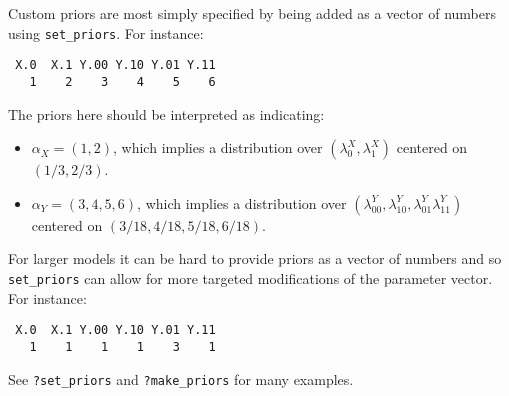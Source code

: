 \documentclass[
  12pt,
]{book}
\newenvironment{Shaded}{\begin{snugshade}}{\end{snugshade}}
\newcommand{\DataTypeTok}[1]{\textcolor[rgb]{0.13,0.29,0.53}{#1}}
\newcommand{\DecValTok}[1]{\textcolor[rgb]{0.00,0.00,0.81}{#1}}
\newcommand{\KeywordTok}[1]{\textcolor[rgb]{0.13,0.29,0.53}{\textbf{#1}}}
\newcommand{\NormalTok}[1]{#1}
\newcommand{\OperatorTok}[1]{\textcolor[rgb]{0.81,0.36,0.00}{\textbf{#1}}}
\newcommand{\StringTok}[1]{\textcolor[rgb]{0.31,0.60,0.02}{#1}}
\providecommand{\tightlist}{%
  \setlength{\itemsep}{0pt}\setlength{\parskip}{0pt}}
\begin{document}
Custom priors are most simply specified by being added as a vector of numbers using \texttt{set\_priors}. For instance:

\begin{Shaded}
\end{Shaded}

\begin{verbatim}
 X.0  X.1 Y.00 Y.10 Y.01 Y.11 
   1    2    3    4    5    6 
\end{verbatim}

The priors here should be interpreted as indicating:

\begin{itemize}
\tightlist
\item
  \(\alpha_X = (1,2)\), which implies a distribution over \((\lambda^X_0, \lambda^X_1)\) centered on \((1/3, 2/3)\).
\item
  \(\alpha_Y = (3,4,5,6)\), which implies a distribution over \((\lambda^Y_{00}, \lambda^Y_{10}, \lambda^Y_{01} \lambda^Y_{11})\) centered on \((3/18, 4/18, 5/18, 6/18)\).
\end{itemize}

For larger models it can be hard to provide priors as a vector of numbers and so \texttt{set\_priors} can allow for more targeted modifications of the parameter vector. For instance:

\begin{Shaded}
\end{Shaded}

\begin{verbatim}
 X.0  X.1 Y.00 Y.10 Y.01 Y.11 
   1    1    1    1    3    1 
\end{verbatim}

See \texttt{?set\_priors} and \texttt{?make\_priors} for many examples.
\end{document}

